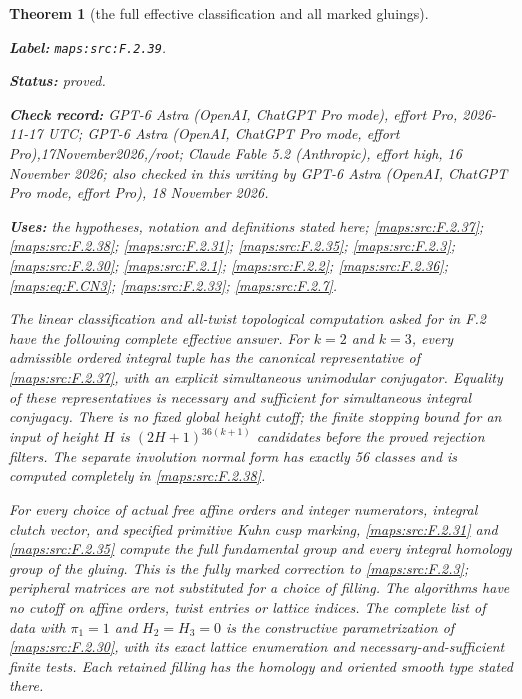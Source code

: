 \documentclass[11pt,a4paper]{article}
\newtheorem{theorem}{Theorem}[section]
\theoremstyle{definition}
\newcommand{\StatementRecord}[4]{\par\smallskip\begingroup\upshape\raggedright\noindent\textbf{Label:} \nolinkurl{#1}.\par\noindent\textbf{Status:} #2.\par\noindent\textbf{Check record:} #3.\par\noindent\textbf{Uses:} #4.\par\endgroup\smallskip}
\newcommand{\CurrentChecker}{GPT-6 Astra (OpenAI, ChatGPT Pro mode, effort Pro), 18 November 2026}
\begin{document}
\begin{theorem}[the full effective classification and all marked gluings]\label{maps:src:F.2.39}
\StatementRecord{maps:src:F.2.39}{proved}{GPT-6 Astra (OpenAI, ChatGPT Pro mode), effort Pro, 2026-11-17 UTC; GPT-6 Astra (OpenAI, ChatGPT Pro mode, effort Pro),17November2026,/root; Claude Fable 5.2 (Anthropic), effort high, 16 November 2026; also checked in this writing by \CurrentChecker}{the hypotheses, notation and definitions stated here; \cref{maps:src:F.2.37}; \cref{maps:src:F.2.38}; \cref{maps:src:F.2.31}; \cref{maps:src:F.2.35}; \cref{maps:src:F.2.3}; \cref{maps:src:F.2.30}; \cref{maps:src:F.2.1}; \cref{maps:src:F.2.2}; \cref{maps:src:F.2.36}; \cref{maps:eq:F.CN3}; \cref{maps:src:F.2.33}; \cref{maps:src:F.2.7}}


The linear classification and all-twist topological computation
asked for in F.2 have the following complete effective answer.
For $k=2$ and $k=3$, every admissible ordered integral tuple
has the canonical representative of \ref{maps:src:F.2.37}, with an explicit
simultaneous unimodular conjugator.  Equality of these
representatives is necessary and sufficient for simultaneous
integral conjugacy.  There is no fixed global height cutoff;
the finite stopping bound for an input of height $H$ is
$(2H+1)^{36(k+1)}$ candidates before the proved rejection
filters.  The separate involution normal form has exactly
56 classes and is computed completely in \ref{maps:src:F.2.38}.

For every choice of actual free affine orders and integer
numerators, integral clutch vector, and specified primitive
Kuhn cusp marking, \ref{maps:src:F.2.31} and \ref{maps:src:F.2.35} compute the full
fundamental group and every integral homology group of the
gluing.  This is the fully marked correction to \ref{maps:src:F.2.3};
peripheral matrices are not substituted for a choice of
filling.  The algorithms have no cutoff on affine orders,
twist entries or lattice indices.  The complete list of data
with $\pi_1=1$ and $H_2=H_3=0$ is the constructive
parametrization of \ref{maps:src:F.2.30}, with its exact lattice enumeration
and necessary-and-sufficient finite tests.  Each retained
filling has the homology and oriented smooth type stated
there.

\end{theorem}
\end{document}
